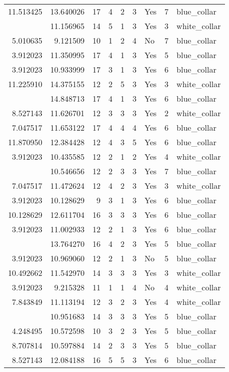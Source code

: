 \documentclass[
]{article}
\begin{document}
\begin{longtable}[t]{rrrrrllrl}
11.513425 & 13.640026 & 17 & 4 & 2 & 3 & Yes & 7 & blue\_collar\\
\addlinespace
3.912023 & 11.156965 & 14 & 5 & 1 & 3 & Yes & 3 & white\_collar\\
5.010635 & 9.121509 & 10 & 1 & 2 & 4 & No & 7 & blue\_collar\\
3.912023 & 11.350995 & 17 & 4 & 1 & 3 & Yes & 5 & blue\_collar\\
3.912023 & 10.933999 & 17 & 3 & 1 & 3 & Yes & 6 & blue\_collar\\
11.225910 & 14.375155 & 12 & 2 & 5 & 3 & Yes & 3 & white\_collar\\
\addlinespace
3.912023 & 14.848713 & 17 & 4 & 1 & 3 & Yes & 6 & blue\_collar\\
8.527143 & 11.626701 & 12 & 3 & 3 & 3 & Yes & 2 & white\_collar\\
7.047517 & 11.653122 & 17 & 4 & 4 & 4 & Yes & 6 & blue\_collar\\
11.870950 & 12.384428 & 12 & 4 & 3 & 5 & Yes & 6 & blue\_collar\\
3.912023 & 10.435585 & 12 & 2 & 1 & 2 & Yes & 4 & white\_collar\\
\addlinespace
4.248495 & 10.546656 & 12 & 2 & 3 & 3 & Yes & 7 & blue\_collar\\
7.047517 & 11.472624 & 12 & 4 & 2 & 3 & Yes & 3 & white\_collar\\
3.912023 & 10.128629 & 9 & 3 & 1 & 3 & Yes & 6 & blue\_collar\\
10.128629 & 12.611704 & 16 & 3 & 3 & 3 & Yes & 6 & blue\_collar\\
3.912023 & 11.002933 & 12 & 2 & 1 & 3 & Yes & 6 & blue\_collar\\
\addlinespace
12.206323 & 13.764270 & 16 & 4 & 2 & 3 & Yes & 5 & blue\_collar\\
3.912023 & 10.969060 & 12 & 2 & 1 & 3 & No & 5 & blue\_collar\\
10.492662 & 11.542970 & 14 & 3 & 3 & 3 & Yes & 3 & white\_collar\\
3.912023 & 9.215328 & 11 & 1 & 1 & 4 & No & 4 & white\_collar\\
7.843849 & 11.113194 & 12 & 3 & 2 & 3 & Yes & 4 & white\_collar\\
\addlinespace
4.700480 & 10.951683 & 14 & 3 & 3 & 3 & Yes & 5 & blue\_collar\\
4.248495 & 10.572598 & 10 & 3 & 2 & 3 & Yes & 5 & blue\_collar\\
8.707814 & 10.597884 & 14 & 2 & 3 & 3 & Yes & 5 & blue\_collar\\
8.527143 & 12.084188 & 16 & 5 & 5 & 3 & Yes & 6 & blue\_collar\\

\end{longtable}
\end{document}

